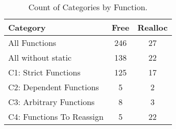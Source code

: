 \begin{table}[H]
   \begin{center}
   \begin{tabularx}{0.6\linewidth}{l|c|c}

      Category & Free & Realloc \\
      \hline

      All Functions& 246 & 27 \\

      All without static& 138 & 22 \\

      C1: Strict Functions& 125 & 17 \\

      C2: Dependent Functions& 5 & 2 \\

      C3: Arbitrary Functions& 8 & 3 \\

      C4: Functions To Reassign& 5 & 22 \\

   \end{tabularx}
\end{center}
   \caption{Count of Categories by Function.}
   \label{tab:categories:overview}
\end{table}

